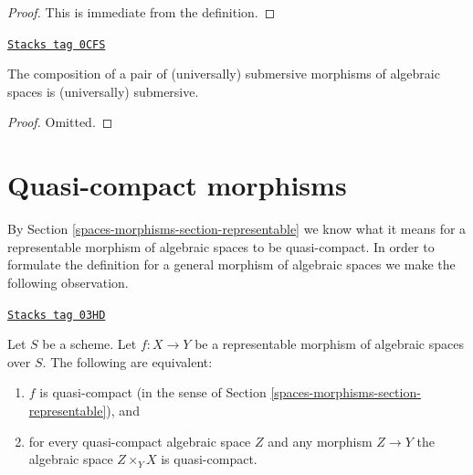 \begin{proof}
This is immediate from the definition.
\end{proof}

\begin{lemma}
\label{spaces-morphisms-lemma-composition-universally-submersive}
\href{https://stacks.math.columbia.edu/tag/0CFS}{\texttt{Stacks tag 0CFS}}

The composition of a pair of (universally) submersive morphisms of
algebraic spaces is (universally) submersive.
\end{lemma}

\begin{proof}
Omitted.
\end{proof}

\section{Quasi-compact morphisms}
\label{spaces-morphisms-section-quasi-compact}
By Section \ref{spaces-morphisms-section-representable} we know what it means for
a representable morphism of algebraic spaces to be quasi-compact.
In order to formulate the definition for a general morphism
of algebraic spaces we make the following observation.

\begin{lemma}
\label{spaces-morphisms-lemma-characterize-representable-quasi-compact}
\href{https://stacks.math.columbia.edu/tag/03HD}{\texttt{Stacks tag 03HD}}

Let $S$ be a scheme.
Let $f : X \to Y$ be a representable morphism of algebraic spaces over $S$.
The following are equivalent:
\begin{enumerate}
\item $f$ is quasi-compact
(in the sense of Section \ref{spaces-morphisms-section-representable}), and
\item for every quasi-compact algebraic space $Z$ and any morphism
$Z \to Y$ the algebraic space $Z \times_Y X$ is quasi-compact.
\end{enumerate}
\end{lemma}

